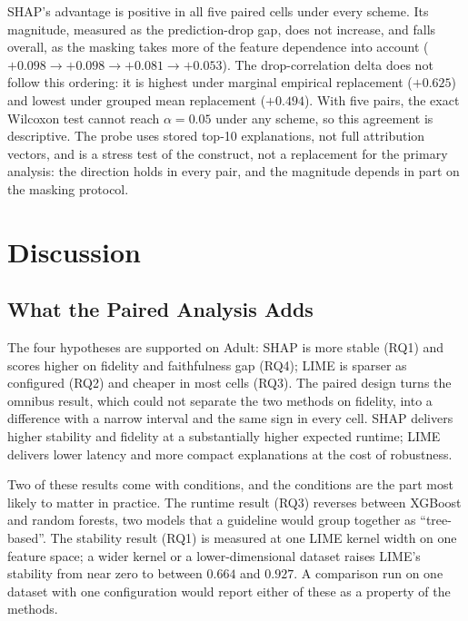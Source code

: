 \documentclass{cleiej}
\begin{document}
SHAP's advantage is positive in all five paired cells under every scheme.
Its magnitude, measured as the prediction-drop gap, does not increase, and
falls overall, as the masking takes more of the feature dependence into
account ($+0.098 \rightarrow +0.098 \rightarrow +0.081 \rightarrow
+0.053$). The drop-correlation delta does not follow this ordering: it is
highest under marginal empirical replacement ($+0.625$) and lowest under
grouped mean replacement ($+0.494$). With five pairs, the exact Wilcoxon
test cannot reach $\alpha = 0.05$ under any scheme, so this agreement is
descriptive. The probe uses stored top-10 explanations, not full
attribution vectors, and is a stress test of the construct, not a
replacement for the primary analysis: the direction holds in every pair,
and the magnitude depends in part on the masking protocol.

\section{Discussion}
\label{sec:discussion}

\subsection{What the Paired Analysis Adds}

The four hypotheses are supported on Adult: SHAP is more stable (RQ1) and
scores higher on fidelity and faithfulness gap (RQ4); LIME is sparser as
configured (RQ2) and cheaper in most cells (RQ3). The paired design turns
the omnibus result, which could not separate the two methods on fidelity,
into a difference with a narrow interval and the same sign in every cell.
SHAP delivers higher stability and fidelity at a substantially higher
expected runtime; LIME delivers lower latency and more compact explanations
at the cost of robustness.

Two of these results come with conditions, and the conditions are the part
most likely to matter in practice. The runtime result (RQ3) reverses
between XGBoost and random forests, two models that a guideline would group
together as ``tree-based''. The stability result (RQ1) is measured at one
LIME kernel width on one feature space; a wider kernel or a
lower-dimensional dataset raises LIME's stability from near zero to between
$0.664$ and $0.927$. A comparison run on one dataset with one
configuration would report either of these as a property of the methods.
\end{document}
